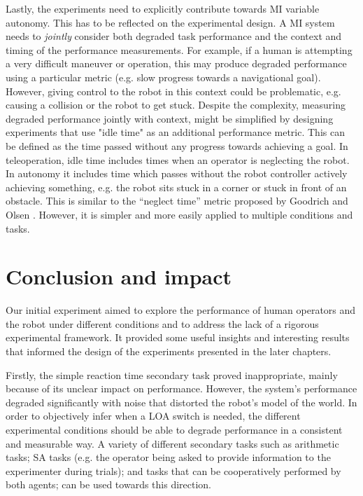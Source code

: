 \documentclass[a4paper,12pt,oneside,openright]{bhamthesis}
\begin{document}
Lastly, the experiments need to explicitly contribute towards MI variable autonomy. This has to be reflected on the experimental design. A MI system needs to \emph{jointly} consider both degraded task performance and the context and timing of the performance measurements. For example, if a human is attempting a very difficult maneuver or operation, this may produce degraded performance using a particular metric (e.g. slow progress towards a navigational goal). However, giving control to the robot in this context could be problematic, e.g. causing a collision or the robot to get stuck. Despite the complexity, measuring degraded performance jointly with context, might be simplified by designing experiments that use "idle time" as an additional performance metric. This can be defined as the time passed without any progress towards achieving a goal. In teleoperation, idle time includes times when an operator is neglecting the robot. In autonomy it includes time which passes without the robot controller actively achieving something, e.g. the robot sits stuck in a corner or stuck in front of an obstacle. This is similar to the ``neglect time'' metric proposed by Goodrich and Olsen \cite{Goodrich2003}. However, it is simpler and more easily applied to multiple conditions and tasks.


\section{Conclusion and impact}
\label{chap3:conclusion}

Our initial experiment aimed to explore the performance of human operators and the robot under different conditions and to address the lack of a rigorous experimental framework. It provided some useful insights and interesting results that informed the design of the experiments presented in the later chapters. 

Firstly, the simple reaction time secondary task proved inappropriate, mainly because of its unclear impact on performance. However, the system's performance degraded significantly with noise that distorted the robot's model of the world. In order to objectively infer when a LOA switch is needed, the different experimental conditions should be able to degrade performance in a consistent and measurable way. A variety of different secondary tasks such as arithmetic tasks; SA tasks (e.g. the operator being asked to provide information to the experimenter during trials); and tasks that can be cooperatively performed by both agents; can be used towards this direction.
\end{document}
